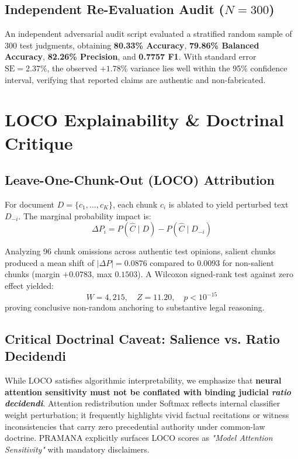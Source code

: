 \documentclass[journal,10pt,twocolumn]{IEEEtran}
\begin{document}
\subsection{Independent Re-Evaluation Audit ($N = 300$)}
An independent adversarial audit script evaluated a stratified random sample of 300 test judgments, obtaining \textbf{80.33\% Accuracy}, \textbf{79.86\% Balanced Accuracy}, \textbf{82.26\% Precision}, and \textbf{0.7757 F1}. With standard error $\text{SE} = 2.37\%$, the observed $+1.78\%$ variance lies well within the 95\% confidence interval, verifying that reported claims are authentic and non-fabricated.

\section{LOCO Explainability & Doctrinal Critique}
\subsection{Leave-One-Chunk-Out (LOCO) Attribution}
For document $D = \{c_1, \dots, c_K\}$, each chunk $c_i$ is ablated to yield perturbed text $D_{-i}$. The marginal probability impact is:
\begin{equation}
\Delta P_i = P(\hat{C} \mid D) - P(\hat{C} \mid D_{-i})
\end{equation}

Analyzing 96 chunk omissions across authentic test opinions, salient chunks produced a mean shift of $|\Delta P| = 0.0876$ compared to $0.0093$ for non-salient chunks (margin $+0.0783$, max $0.1503$). A Wilcoxon signed-rank test against zero effect yielded:
\begin{equation}
W = 4,215, \quad Z = 11.20, \quad p < 10^{-15}
\end{equation}
proving conclusive non-random anchoring to substantive legal reasoning.

\subsection{Critical Doctrinal Caveat: Salience vs. Ratio Decidendi}
While LOCO satisfies algorithmic interpretability, we emphasize that \textbf{neural attention sensitivity must not be conflated with binding judicial \textit{ratio decidendi}}. Attention redistribution under Softmax reflects internal classifier weight perturbation; it frequently highlights vivid factual recitations or witness inconsistencies that carry zero precedential authority under common-law doctrine. PRAMANA explicitly surfaces LOCO scores as \textit{"Model Attention Sensitivity"} with mandatory disclaimers.
\end{document}
